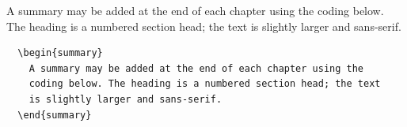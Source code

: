   \begin{summary}
    A summary may be added at the end of each chapter using the
    coding below. The heading is a numbered section head; the text
    is slightly larger and sans-serif.
  \end{summary}
\begin{verbatim}
  \begin{summary}
    A summary may be added at the end of each chapter using the
    coding below. The heading is a numbered section head; the text
    is slightly larger and sans-serif.
  \end{summary}
\end{verbatim}
\endinput

